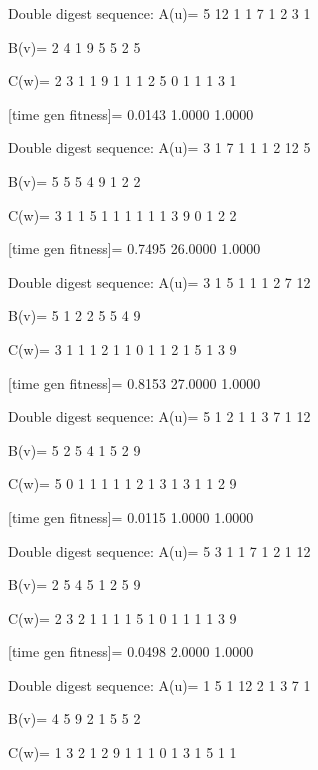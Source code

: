 Double digest sequence:
A(u)=
     5    12     1     1     7     1     2     3     1

B(v)=
     2     4     1     9     5     5     2     5

C(w)=
     2     3     1     1     9     1     1     1     2     5     0     1     1     1     3     1

[time gen fitness]=
    0.0143    1.0000    1.0000

Double digest sequence:
A(u)=
     3     1     7     1     1     1     2    12     5

B(v)=
     5     5     5     4     9     1     2     2

C(w)=
     3     1     1     5     1     1     1     1     1     1     3     9     0     1     2     2

[time gen fitness]=
    0.7495   26.0000    1.0000

Double digest sequence:
A(u)=
     3     1     5     1     1     1     2     7    12

B(v)=
     5     1     2     2     5     5     4     9

C(w)=
     3     1     1     1     2     1     1     0     1     1     2     1     5     1     3     9

[time gen fitness]=
    0.8153   27.0000    1.0000

Double digest sequence:
A(u)=
     5     1     2     1     1     3     7     1    12

B(v)=
     5     2     5     4     1     5     2     9

C(w)=
     5     0     1     1     1     1     1     2     1     3     1     3     1     1     2     9

[time gen fitness]=
    0.0115    1.0000    1.0000

Double digest sequence:
A(u)=
     5     3     1     1     7     1     2     1    12

B(v)=
     2     5     4     5     1     2     5     9

C(w)=
     2     3     2     1     1     1     1     5     1     0     1     1     1     1     3     9

[time gen fitness]=
    0.0498    2.0000    1.0000

Double digest sequence:
A(u)=
     1     5     1    12     2     1     3     7     1

B(v)=
     4     5     9     2     1     5     5     2

C(w)=
     1     3     2     1     2     9     1     1     1     0     1     3     1     5     1     1

